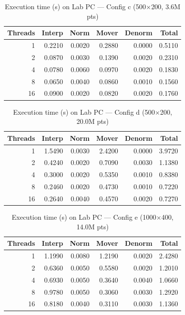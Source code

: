 \documentclass[12pt,a4paper]{article}
\begin{document}
\begin{table}[H]
\centering
\caption{Execution time (s) on Lab PC --- Config c (500$\times$200, 3.6M pts)}
\label{tab:lab_c}
\begin{tabular}{rrrrrr}
\toprule
\textbf{Threads} & \textbf{Interp} & \textbf{Norm} & \textbf{Mover} & \textbf{Denorm} & \textbf{Total} \\
\midrule
1  & 0.2210 & 0.0020 & 0.2880 & 0.0000 & 0.5110 \\
2  & 0.0870 & 0.0030 & 0.1390 & 0.0020 & 0.2310 \\
4  & 0.0780 & 0.0060 & 0.0970 & 0.0020 & 0.1830 \\
8  & 0.0650 & 0.0040 & 0.0860 & 0.0010 & 0.1560 \\
16 & 0.0900 & 0.0020 & 0.0820 & 0.0020 & 0.1760 \\
\bottomrule
\end{tabular}
\end{table}

\begin{table}[H]
\centering
\caption{Execution time (s) on Lab PC --- Config d (500$\times$200, 20.0M pts)}
\label{tab:lab_d}
\begin{tabular}{rrrrrr}
\toprule
\textbf{Threads} & \textbf{Interp} & \textbf{Norm} & \textbf{Mover} & \textbf{Denorm} & \textbf{Total} \\
\midrule
1  & 1.5490 & 0.0030 & 2.4200 & 0.0000 & 3.9720 \\
2  & 0.4240 & 0.0020 & 0.7090 & 0.0030 & 1.1380 \\
4  & 0.3000 & 0.0020 & 0.5350 & 0.0010 & 0.8380 \\
8  & 0.2460 & 0.0020 & 0.4730 & 0.0010 & 0.7220 \\
16 & 0.2640 & 0.0040 & 0.4570 & 0.0020 & 0.7270 \\
\bottomrule
\end{tabular}
\end{table}

\begin{table}[H]
\centering
\caption{Execution time (s) on Lab PC --- Config e (1000$\times$400, 14.0M pts)}
\label{tab:lab_e}
\begin{tabular}{rrrrrr}
\toprule
\textbf{Threads} & \textbf{Interp} & \textbf{Norm} & \textbf{Mover} & \textbf{Denorm} & \textbf{Total} \\
\midrule
1  & 1.1990 & 0.0080 & 1.2190 & 0.0020 & 2.4280 \\
2  & 0.6360 & 0.0050 & 0.5580 & 0.0020 & 1.2010 \\
4  & 0.6930 & 0.0050 & 0.3640 & 0.0040 & 1.0660 \\
8  & 0.9780 & 0.0050 & 0.3060 & 0.0030 & 1.2920 \\
16 & 0.8180 & 0.0040 & 0.3110 & 0.0030 & 1.1360 \\
\bottomrule
\end{tabular}
\end{table}
\end{document}
